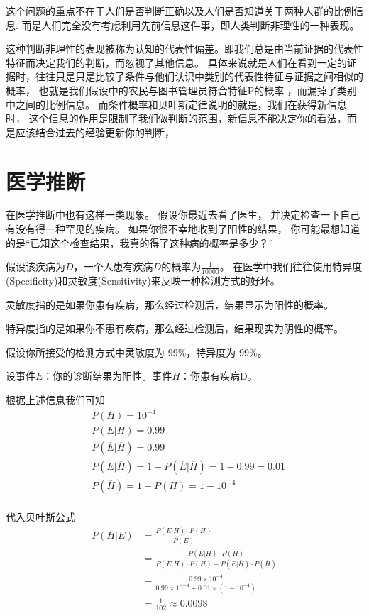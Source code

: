 \documentclass[a4paper,AutoFakeBold,oneside,12pt,fontset=windows]{book}
\begin{document}
这个问题的重点不在于人们是否判断正确以及人们是否知道关于两种人群的比例信息.
而是人们完全没有考虑利用先前信息这件事，即人类判断非理性的一种表现。

这种判断非理性的表现被称为认知的代表性偏差。即我们总是由当前证据的代表性特征而决定我们的判断，而忽视了其他信息。
具体来说就是人们在看到一定的证据时，往往只是只是比较了条件与他们认识中类别的代表性特征与证据之间相似的概率，
也就是我们假设中的农民与图书管理员符合特征P的概率
，而漏掉了类别中之间的比例信息。
而条件概率和贝叶斯定律说明的就是，我们在获得新信息时，
这个信息的作用是限制了我们做判断的范围，新信息不能决定你的看法，而是应该结合过去的经验更新你的判断，
\section{医学推断}
在医学推断中也有这样一类现象。
假设你最近去看了医生，
并决定检查一下自己有没有得一种罕见的疾病。
如果你很不幸地收到了阳性的结果，
你可能最想知道的是“已知这个检查结果，我真的得了这种病的概率是多少？”

假设该疾病为$D$，一个人患有疾病$D$的概率为$\frac{1}{10000}$。
在医学中我们往往使用特异度(Specificity)和灵敏度(Sensitivity)来反映一种检测方式的好坏。

灵敏度指的是如果你患有疾病，那么经过检测后，结果显示为阳性的概率。

特异度指的是如果你不患有疾病，那么经过检测后，结果现实为阴性的概率。

假设你所接受的检测方式中灵敏度为 $99\%$，特异度为 $99\%$。

设事件$E$：你的诊断结果为阳性。事件$H$：你患有疾病D。

根据上述信息我们可知
\begin{align*}
	&P(H)=10^{-4}\\
	&P(E|H)=0.99\\
	&P(\overline E|\overline H)=0.99\\
	&P(E|\overline{H})=1-P(\overline E|\overline H)=1-0.99=0.01\\
	&P(\overline H)=1-P(H)=1-10^{-4}\\
\end{align*}

代入贝叶斯公式
\begin{align*}
	P(H|E)&=\frac{P(E|H)\cdot P(H)}{P(E)}\\
	&= \frac{P(E|H)\cdot P(H)}{P(E|H)\cdot P(H)+P(E|\overline{H})\cdot P(\overline H)}\\
	&=\frac{0.99\times 10^{-4} }{0.99\times 10^{-4} +0.01\times (1-10^{-4})}\\
	&=\frac{1}{102}\approx 0.0098
\end{align*}
\end{document}
